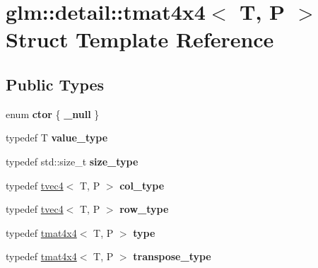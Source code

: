 \hypertarget{structglm_1_1detail_1_1tmat4x4}{\section{glm\-:\-:detail\-:\-:tmat4x4$<$ T, P $>$ Struct Template Reference}
\label{structglm_1_1detail_1_1tmat4x4}
}
\subsection*{Public Types}
\begin{DoxyCompactItemize}
\item 
enum {\bfseries ctor} \{ {\bfseries \-\_\-null}
 \}
\item 
\hypertarget{structglm_1_1detail_1_1tmat4x4_adce6da39b62e447be40eaa843bc774e3}{typedef T {\bfseries value\-\_\-type}}\label{structglm_1_1detail_1_1tmat4x4_adce6da39b62e447be40eaa843bc774e3}

\item 
\hypertarget{structglm_1_1detail_1_1tmat4x4_a902f3edef1874ef653562bdd9947fcf9}{typedef std\-::size\-\_\-t {\bfseries size\-\_\-type}}\label{structglm_1_1detail_1_1tmat4x4_a902f3edef1874ef653562bdd9947fcf9}

\item 
\hypertarget{structglm_1_1detail_1_1tmat4x4_ade9e794ddd9c2758005f29ddb84e320f}{typedef \hyperlink{structglm_1_1detail_1_1tvec4}{tvec4}$<$ T, P $>$ {\bfseries col\-\_\-type}}\label{structglm_1_1detail_1_1tmat4x4_ade9e794ddd9c2758005f29ddb84e320f}

\item 
\hypertarget{structglm_1_1detail_1_1tmat4x4_a5db91d0e5acad7201a6624c595bcb462}{typedef \hyperlink{structglm_1_1detail_1_1tvec4}{tvec4}$<$ T, P $>$ {\bfseries row\-\_\-type}}\label{structglm_1_1detail_1_1tmat4x4_a5db91d0e5acad7201a6624c595bcb462}

\item 
\hypertarget{structglm_1_1detail_1_1tmat4x4_a692f6b423a90288bd4043a6c447f7864}{typedef \hyperlink{structglm_1_1detail_1_1tmat4x4}{tmat4x4}$<$ T, P $>$ {\bfseries type}}\label{structglm_1_1detail_1_1tmat4x4_a692f6b423a90288bd4043a6c447f7864}

\item 
\hypertarget{structglm_1_1detail_1_1tmat4x4_a92072726f44cd765df13235e7a1c45a8}{typedef \hyperlink{structglm_1_1detail_1_1tmat4x4}{tmat4x4}$<$ T, P $>$ {\bfseries transpose\-\_\-type}}\label{structglm_1_1detail_1_1tmat4x4_a92072726f44cd765df13235e7a1c45a8}

\end{DoxyCompactItemize}
